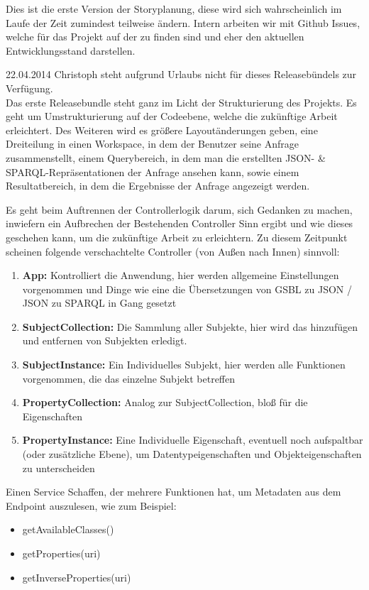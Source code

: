 Dies ist die erste Version der Storyplanung, diese wird sich wahrscheinlich im Laufe der Zeit zumindest teilweise ändern. Intern arbeiten wir mit Github Issues, welche für das Projekt auf der  zu finden sind und eher den aktuellen Entwicklungsstand darstellen.

\begin{release}{22.04.2014}
Christoph steht aufgrund Urlaubs nicht für dieses Releasebündels zur Verfügung.\\
Das erste Releasebundle steht ganz im Licht der Strukturierung des Projekts. Es geht um Umstrukturierung auf der Codeebene, welche die zukünftige Arbeit erleichtert. Des Weiteren wird es größere Layoutänderungen geben, eine Dreiteilung in einen Workspace, in dem der Benutzer seine Anfrage zusammenstellt, einem Querybereich, in dem man die erstellten JSON- \& SPARQL-Repräsentationen der Anfrage ansehen kann, sowie einem Resultatbereich, in dem die Ergebnisse der Anfrage angezeigt werden.

%
Es geht beim Auftrennen der Controllerlogik darum, sich Gedanken zu machen, inwiefern ein Aufbrechen der Bestehenden Controller Sinn ergibt und wie dieses geschehen kann, um die zukünftige Arbeit zu erleichtern. Zu diesem Zeitpunkt scheinen folgende verschachtelte Controller (von Außen nach Innen) sinnvoll:
\begin{enumerate}
\item \textbf{App:} Kontrolliert die Anwendung, hier werden allgemeine Einstellungen vorgenommen und Dinge wie eine die Übersetzungen von GSBL zu JSON / JSON zu SPARQL in Gang gesetzt
\item\textbf{SubjectCollection:} Die Sammlung aller Subjekte, hier wird das hinzufügen und entfernen von Subjekten erledigt.
\item\textbf{SubjectInstance:} Ein Individuelles Subjekt, hier werden alle Funktionen vorgenommen, die das einzelne Subjekt betreffen
\item\textbf{PropertyCollection:} Analog zur SubjectCollection, bloß für die Eigenschaften
\item\textbf{PropertyInstance:} Eine Individuelle Eigenschaft, eventuell noch aufspaltbar (oder zusätzliche Ebene), um Datentypeigenschaften und Objekteigenschaften zu unterscheiden
\end{enumerate}

\pagebreak

%
Einen Service Schaffen, der mehrere Funktionen hat, um Metadaten aus dem Endpoint auszulesen, wie zum Beispiel:
\begin{itemize}
\item getAvailableClasses()
\item getProperties(uri) 
\item getInverseProperties(uri)
\end{itemize}


\end{release}

